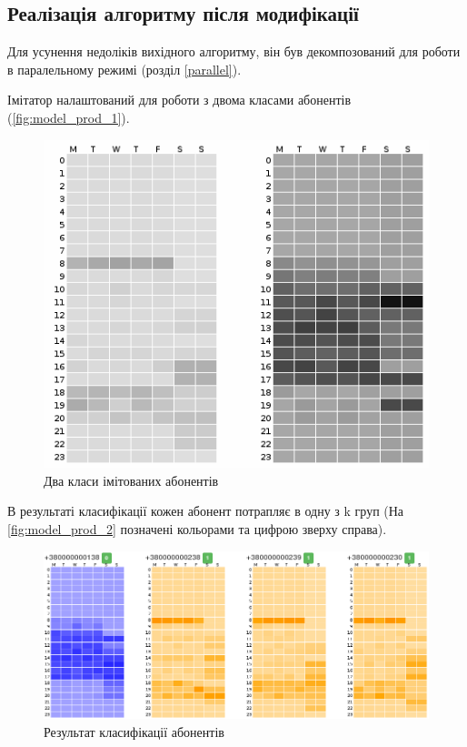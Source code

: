 

\subsection{Реалізація алгоритму після модифікації}

Для усунення недоліків вихідного алгоритму, він був декомпозований для роботи в паралельному режимі (розділ \ref{parallel}).

Імітатор налаштований для роботи з двома класами абонентів (\autoref{fig:model_prod_1}).

\begin{figure}[h!]
        \begin{center}
            \includegraphics[scale=0.6]{resources/model_2_1.png}
        \end{center}
        \caption{Два класи імітованих абонентів}
        \label{fig:model_prod_1}
\end{figure}

В результаті класифікації кожен абонент потрапляє в одну з k груп (На \autoref{fig:model_prod_2} позначені кольорами та цифрою зверху справа).

\begin{figure}[h!]
        \begin{center}
            \includegraphics[scale=0.4]{resources/model_2_2.png}
        \end{center}
        \caption{Результат класифікації абонентів}
        \label{fig:model_prod_2}
\end{figure}

